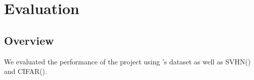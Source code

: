 \documentclass{l4proj}
\begin{document}









\chapter{Evaluation}
\label{chap:evaluation}
\section{Overview}
We evaluated the performance of the project using \cite{Samagaio}'s dataset as well as SVHN(\cite{svhn}) and CIFAR(\cite{CIFAR}). 
\end{document}
